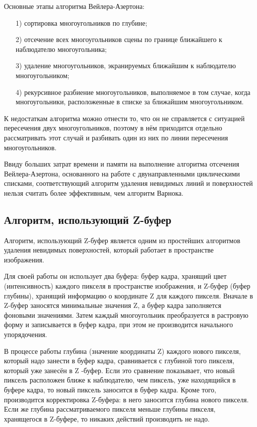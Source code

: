 Основные этапы алгоритма Вейлера-Азертона:
\begin{enumerate}
	\item[1)] сортировка многоугольников по глубине;
	\item[2)] отсечение всех многоугольников сцены по границе ближайшего к наблюдателю многоугольника;
	\item[3)] удаление многоугольников, экранируемых ближайшим к наблюдателю многоугольником;
	\item[4)] рекурсивное разбиение многоугольников, выполняемое в том случае, когда многоугольники, расположенные в списке за ближайшим многоугольником.
\end{enumerate}

К недостаткам алгоритма можно отнести то, что он не справляется с ситуацией пересечения двух многоугольников, поэтому в нём приходится отдельно рассматривать этот случай и разбивать один из них по линии пересечения многоугольников.

Ввиду больших затрат времени и памяти на выполнение алгоритма отсечения Вейлера-Азертона, основанного на работе с двунаправленными циклическими списками, соответствующий алгоритм удаления невидимых линий и поверхностей нельзя считать более эффективным, чем алгоритм Варнока.

\subsection{Алгоритм, использующий Z-буфер}
Алгоритм, использующий Z-буфер является одним из простейших алгоритмов удаления невидимых поверхностей, который работает в пространстве изображения.

Для своей работы он использует два буфера: буфер кадра, хранящий цвет (интенсивность) каждого пикселя в пространстве изображения, и Z-буфер (буфер глубины), хранящий информацию о координате Z для каждого пикселя. Вначале в Z-буфер заносятся минимальные значения Z, а буфер кадра заполняется фоновыми значениями. Затем каждый многоугольник преобразуется в растровую форму и записывается в буфер кадра, при этом не производится начального упорядочения.

В процессе работы глубина (значение координаты Z) каждого нового пикселя, который надо занести в буфер кадра, сравнивается с глубиной того пикселя, который уже занесён в Z -буфер. Если это сравнение показывает, что новый пиксель расположен ближе к наблюдателю, чем пиксель, уже находящийся в буфере кадра, то новый пиксель заносится в буфер кадра. Кроме того, производится корректировка Z-буфера: в него заносится глубина нового пикселя. Если же глубина рассматриваемого пикселя меньше глубины пикселя, хранящегося в Z-буфере, то никаких действий производить не надо.

